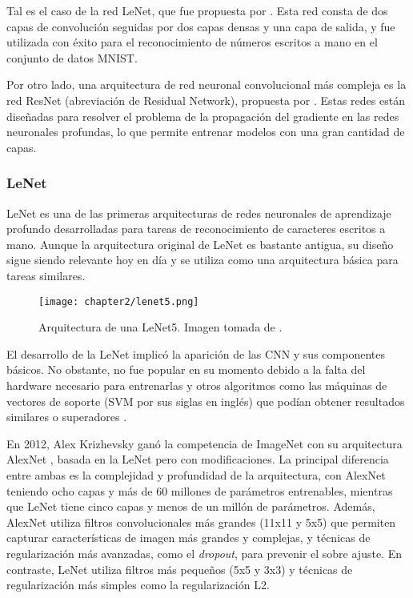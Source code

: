 Tal es el caso de la red LeNet, que fue propuesta por \cite{lecun1998gradient}. Esta red consta de dos capas de
convolución seguidas por dos capas densas y una capa de salida, y fue utilizada con éxito para el reconocimiento de
números escritos a mano en el conjunto de datos MNIST.

Por otro lado, una arquitectura de red neuronal convolucional más compleja es la red ResNet (abreviación de Residual
Network), propuesta por \cite{he2016deep}. Estas redes están diseñadas para resolver el problema de la propagación del
gradiente en las redes neuronales profundas, lo que permite entrenar modelos con una gran cantidad de capas.

\subsubsection{LeNet}
LeNet es una de las primeras arquitecturas de redes neuronales de aprendizaje profundo desarrolladas para tareas de
reconocimiento de caracteres escritos a mano. Aunque la arquitectura original de LeNet es bastante antigua, su diseño
sigue siendo relevante hoy en día y se utiliza como una arquitectura básica para tareas similares.

\begin{figure}[H]
    \centering
    \texttt{[image: chapter2/lenet5.png]}

    \caption[Arquitectura de una LeNet5]{Arquitectura de una LeNet5. Imagen tomada de \cite{lecun1998gradient}.}
    \label{fig:lenet}
\end{figure}

El desarrollo de la LeNet implicó la aparición de las CNN y sus componentes básicos. No obstante, no fue popular en su
momento debido a la falta del hardware necesario para entrenarlas y otros algoritmos como las máquinas de vectores de
soporte (SVM por sus siglas en inglés) que podían obtener resultados similares o superadores \parencite{lecun1998gradient, decoste2002training, lauer2007trainable}.

En 2012, Alex Krizhevsky ganó la competencia de ImageNet con su arquitectura AlexNet \parencite{krizhevsky2017imagenet}, basada en la LeNet pero con modificaciones. La principal diferencia entre ambas es la
complejidad y profundidad de la arquitectura, con AlexNet teniendo ocho capas y más de 60 millones de parámetros
entrenables, mientras que LeNet tiene cinco capas y menos de un millón de parámetros. Además, AlexNet utiliza filtros
convolucionales más grandes (11x11 y 5x5) que permiten capturar características de imagen más grandes y complejas, y
técnicas de regularización más avanzadas, como el {\it dropout}, para prevenir el sobre ajuste. En contraste, LeNet
utiliza filtros más pequeños (5x5 y 3x3) y técnicas de regularización más simples como la regularización L2.

